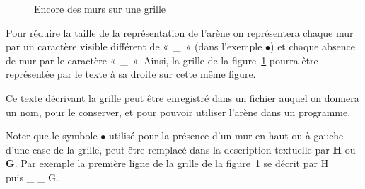 \documentclass[a4paper]{paper}
\newcommand{\xcol}{blue}
\newcommand{\ycol}{red}
\begin{document}
\begin{figure}[htbp]
  \centering
  \caption{Encore des murs sur une grille}\label{fig:format1}
\end{figure}

\medskip
Pour réduire la taille de la représentation de l'arène on représentera chaque mur par un caractère visible différent de «~\_~» (dans l'exemple $\bullet{}$) et chaque absence de mur par le caractère «~\_~».
Ainsi, la grille de la figure~\ref{fig:format1} pourra être représentée par le texte à sa droite sur cette même figure. 

Ce texte décrivant la grille peut \^etre enregistré dans un fichier auquel on donnera un nom, pour le conserver, et pour pouvoir utiliser l'arène dans un programme.

Noter que le symbole $\bullet{}$ utilisé pour la présence d'un mur en haut ou à gauche d'une case de la grille, peut \^etre remplacé dans la description textuelle par \textbf{H} ou \textbf{G}. Par exemple la première ligne de la grille  de la figure~\ref{fig:format1} se décrit par  {H \_ \_} puis {\_ \_ G}.
\end{document}
